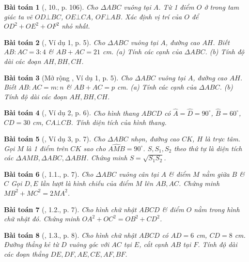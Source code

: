 \documentclass{article}
\newtheorem{baitoan}{Bài toán}
\begin{document}
\begin{baitoan}[\cite{Tuyen_Toan_9}, 10., p. 106]
	Cho $\Delta ABC$ vuông tại $A$. Từ 1 điểm $O$ ở trong tam giác ta vẽ $OD\bot BC$, $OE\bot CA$, $OF\bot AB$. Xác định vị trí của $O$ để $OD^2 + OE^2 + OF^2$ nhỏ nhất.
\end{baitoan}

\begin{baitoan}[\cite{TLCT_THCS_Toan_9_hinh_hoc}, Ví dụ 1, p. 5]
	Cho $\Delta ABC$ vuông tại $A$, đường cao $AH$. Biết $AB:AC = 3:4$ \& $AB + AC = 21$ {\rm cm}. (a) Tính các cạnh của $\Delta ABC$. (b) Tính độ dài các đoạn $AH,BH,CH$.
\end{baitoan}

\begin{baitoan}[Mở rộng \cite{TLCT_THCS_Toan_9_hinh_hoc}, Ví dụ 1, p. 5]
	Cho $\Delta ABC$ vuông tại $A$, đường cao $AH$. Biết $AB:AC = m:n$ \& $AB + AC = p$ {\rm cm}. (a) Tính các cạnh của $\Delta ABC$. (b) Tính độ dài các đoạn $AH,BH,CH$.
\end{baitoan}

\begin{baitoan}[\cite{TLCT_THCS_Toan_9_hinh_hoc}, Ví dụ 2, p. 6]
	Cho hình thang $ABCD$ có $\widehat{A} = \widehat{D} = 90^\circ$, $\widehat{B} = 60^\circ$, $CD = 30$ {\rm cm}, $CA\bot CB$. Tính diện tích của hình thang.
\end{baitoan}

\begin{baitoan}[\cite{TLCT_THCS_Toan_9_hinh_hoc}, Ví dụ 3, p. 7]
	Cho $\Delta ABC$ nhọn, đường cao $CK$, $H$ là trực tâm. Gọi $M$ là 1 điểm trên $CK$ sao cho $\widehat{AMB} = 90^\circ$. $S,S_1,S_2$ theo thứ tự là diện tích các $\Delta AMB,\Delta ABC,\Delta ABH$. Chứng minh $S = \sqrt{S_1S_2}$.
\end{baitoan}

\begin{baitoan}[\cite{TLCT_THCS_Toan_9_hinh_hoc}, 1.1., p. 7]
	Cho $\Delta ABC$ vuông cân tại $A$ \& điểm $M$ nằm giữa $B$ \& $C$ Gọi $D,E$ lần lượt là hình chiếu của điểm $M$ lên $AB,AC$. Chứng minh $MB^2 + MC^2 = 2MA^2$.
\end{baitoan}

\begin{baitoan}[\cite{TLCT_THCS_Toan_9_hinh_hoc}, 1.2., p. 7]
	Cho hình chữ nhật $ABCD$ \& điểm $O$ nằm trong hình chữ nhật đó. Chứng minh $OA^2 + OC^2 = OB^2 + CD^2$.
\end{baitoan}

\begin{baitoan}[\cite{TLCT_THCS_Toan_9_hinh_hoc}, 1.3., p. 8]
	Cho hình chữ nhật $ABCD$ có $AD = 6$ {\rm cm}, $CD = 8$ {\rm cm}. Đường thẳng kẻ từ $D$ vuông góc với $AC$ tại $E$, cắt cạnh $AB$ tại $F$. Tính độ dài các đoạn thẳng $DE,DF,AE,CE,AF,BF$.
\end{baitoan}
\end{document}
